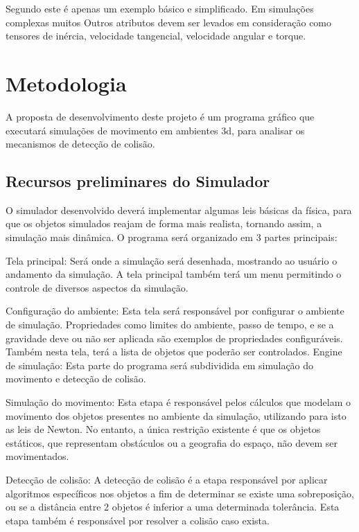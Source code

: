 Segundo  este é apenas um exemplo básico e simplificado. Em simulações complexas muitos Outros atributos devem ser levados em consideração como tensores de inércia, velocidade tangencial, velocidade angular e torque.

\section{Metodologia}

A  proposta de desenvolvimento deste projeto é um programa gráfico que
executará simulações de movimento em ambientes 3d, para analisar os mecanismos de detecção de colisão.

\subsection{Recursos preliminares do Simulador}
O simulador desenvolvido deverá implementar algumas leis básicas da física, para que os objetos simulados reajam de forma mais realista, tornando assim, a simulação mais dinâmica. O programa será organizado em 3 partes principais:

Tela principal: Será onde a simulação será desenhada, mostrando ao usuário o andamento da simulação. A tela principal também terá um menu permitindo o controle de diversos aspectos da simulação. 

Configuração do ambiente: Esta tela será responsável por configurar o ambiente de simulação. Propriedades como limites do ambiente, passo de tempo, e se a gravidade deve ou não ser aplicada são exemplos de propriedades configuráveis. Também nesta tela, terá a lista de objetos que poderão ser controlados.
Engine de simulação: Esta parte do programa será subdividida em simulação do movimento e detecção de colisão. 

Simulação do movimento: Esta etapa é responsável pelos cálculos que modelam o movimento dos objetos presentes no ambiente da simulação, utilizando para isto as leis de Newton. No entanto, a única restrição existente é que os objetos estáticos, que representam obstáculos ou a geografia do espaço, não devem ser movimentados.

Detecção de colisão: A detecção de colisão é a etapa responsável por aplicar algoritmos específicos nos objetos a fim de determinar se existe uma sobreposição, ou se a distância entre 2 objetos é inferior a uma determinada tolerância. Esta etapa também é responsável por resolver a colisão caso exista. 

